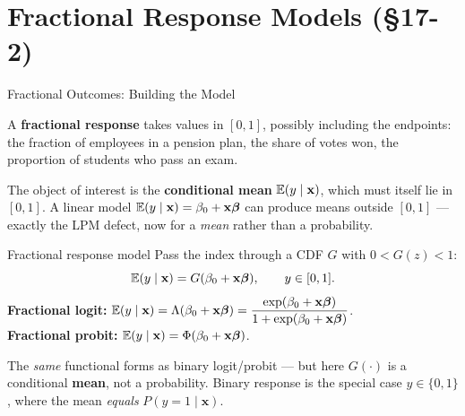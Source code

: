 \documentclass[aspectratio=169, 12pt]{beamer}
\newcommand{\xbeta}{\mathbf{x}\boldsymbol{\beta}}   %
\begin{document}
\section{Fractional Response Models (\S17-2)}

\begin{frame}[shrink=8]{Fractional Outcomes: Building the Model}

  A \textbf{fractional response} takes values in $[0,1]$, possibly including the
  endpoints: the fraction of employees in a pension plan, the share of votes won,
  the proportion of students who pass an exam.

  \smallskip

  \begin{keybox}
    The object of interest is the \textbf{conditional mean} $\operatorname{\mathbb{E}}(y\mid\mathbf{x})$,
    which must itself lie in $[0,1]$. A linear model
    $\E(y\mid\mathbf{x})=\beta_0+\xbeta$ can produce means outside $[0,1]$ ---
    exactly the LPM defect, now for a \emph{mean} rather than a probability.
  \end{keybox}

  \smallskip

  \begin{definitionbox}{Fractional response model}
    Pass the index through a CDF $G$ with $0 < G(z) < 1$:
    \[
      \E(y\mid\mathbf{x}) = G(\beta_0 + \xbeta), \qquad y \in [0,1].
    \]
    \textbf{Fractional logit:}\;\;
    $\E(y\mid\mathbf{x}) = \Lambda(\beta_0+\xbeta)
       = \dfrac{\exp(\beta_0+\xbeta)}{1+\exp(\beta_0+\xbeta)}$.
    \\[3pt]
    \textbf{Fractional probit:}\;\;
    $\E(y\mid\mathbf{x}) = \Phi(\beta_0+\xbeta)$.
  \end{definitionbox}

  \smallskip

  \begin{keybox}
    \small
    The \emph{same} functional forms as binary logit/probit --- but here $G(\cdot)$
    is a conditional \textbf{mean}, not a probability. Binary response is the
    special case $y\in\{0,1\}$, where the mean \emph{equals} $P(y=1\mid\mathbf{x})$.
  \end{keybox}

\end{frame}
\end{document}
